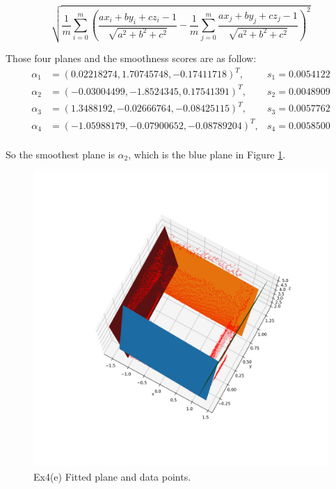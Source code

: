 \documentclass[
  course = {{16-811 Math Fundamentals for Robotics}},
  quartile = {{1}},
  assignment = 3,
  name = {{Kangle Deng}},
  email = {{kangled@andrew.cmu.edu}},
  firstexercise = 1
]{aga-homework}
\begin{document}
\begin{equation*}
    \sqrt{\frac{1}{m}\sum \limits_{i=0}^m (\frac{ax_i+by_i+cz_i-1}{\sqrt{a^2+b^2+c^2}} - \frac{1}{m} \sum \limits_{j=0}^m \frac{ax_j+by_j+cz_j-1}{\sqrt{a^2+b^2+c^2}})^2}
\end{equation*}

Those four planes and the smoothness scores are as follow:
\begin{equation*}
    \begin{aligned}
        \alpha_1 & = (0.02218274,1.70745748,-0.17411718)^T, & s_1 = 0.0054122\\
        \alpha_2 & = (-0.03004499, -1.8524345,   0.17541391)^T, & s_2 = 0.0048909\\
        \alpha_3 & = (1.3488192,  -0.02666764, -0.08425115)^T, & s_3 = 0.0057762 \\
        \alpha_4 & = (-1.05988179, -0.07900652, -0.08789204)^T, & s_4 = 0.0058500\\
    \end{aligned}
\end{equation*}

So the smoothest plane is $\alpha_2$, which is the blue plane in Figure \ref{fig:hw3_ex4e}.

\begin{figure}
    \centering
    \includegraphics[width=\textwidth]{math/fig/hw3/ex4e.png}
    \caption{Ex4(e) Fitted plane and data points.}
    \label{fig:hw3_ex4e}
\end{figure}
\end{document}
